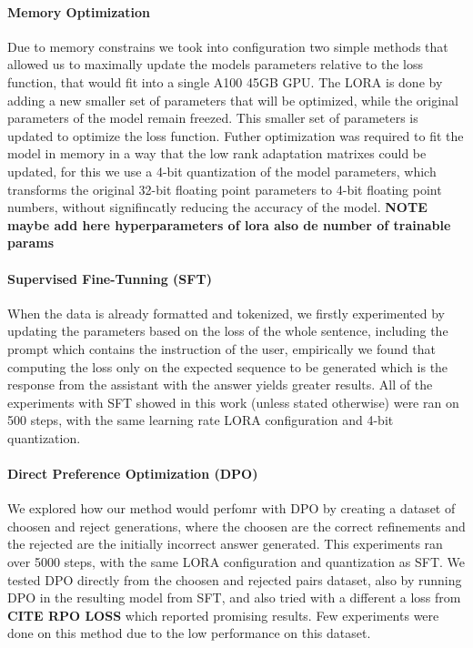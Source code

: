 \documentclass[a4paper,10pt]{article}
\begin{document}
\paragraph {Memory Optimization}
Due to memory constrains we took into configuration two simple methods that allowed us to maximally update the models parameters relative to the loss function, that would fit into a single A100 45GB GPU. The LORA is done by adding a new smaller set of parameters that will be optimized, while the original parameters of the model remain freezed. This smaller set of parameters is updated to optimize the loss function. Futher optimization was required to fit the model in memory in a way that the low rank adaptation matrixes could be updated, for this we use a 4-bit quantization of the model parameters, which transforms the original 32-bit floating point parameters to 4-bit floating point numbers, without signifincatly reducing the accuracy of the model. \textbf{NOTE maybe add here hyperparameters of lora also de number of trainable params}
\paragraph{Supervised Fine-Tunning (SFT)}
When the data is already formatted and tokenized, we firstly experimented by updating the parameters based on the loss of the whole sentence, including the prompt which contains the instruction of the user, empirically we found that computing the loss only on the expected sequence to be generated which is the response from the assistant with the answer yields greater results. All of the experiments with SFT showed in this work (unless stated otherwise) were ran on 500 steps, with the same learning rate LORA configuration and 4-bit quantization.
\paragraph{Direct Preference Optimization (DPO)}
We explored how our method would perfomr with DPO by creating a dataset of choosen and reject generations, where the choosen are the correct refinements and the rejected are the initially incorrect answer generated. This experiments ran over 5000 steps, with the same LORA configuration and quantization as SFT. We tested DPO directly from the choosen and rejected pairs dataset, also by running DPO in the resulting model from SFT, and also tried with a different a loss from \textbf{CITE RPO LOSS} which reported promising results. Few experiments were done on this method due to the low performance on this dataset.
\end{document}
